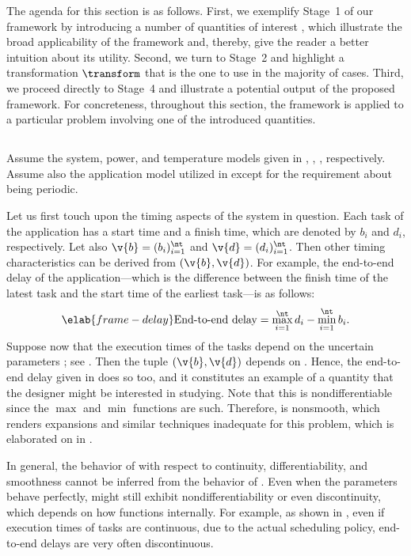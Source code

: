 The agenda for this section is as follows. First, we exemplify Stage~1 of our
framework by introducing a number of quantities of interest \g, which illustrate
the broad applicability of the framework and, thereby, give the reader a better
intuition about its utility. Second, we turn to Stage~2 and highlight a
transformation $\transform$ that is the one to use in the majority of cases.
Third, we proceed directly to Stage~4 and illustrate a potential output of the
proposed framework. For concreteness, throughout this section, the framework is
applied to a particular problem involving one of the introduced quantities.

\subsection{\problemtitle}

Assume the system, power, and temperature models given in ,
, , respectively. Assume also the
application model utilized in  except for the
requirement about being periodic.

Let us first touch upon the timing aspects of the system in question. Each task
of the application has a start time and a finish time, which are denoted by
$b_i$ and $d_i$, respectively. Let also $\v{b} = (b_i)_{i = 1}^\nt$ and $\v{d} =
(d_i)_{i = 1}^\nt$. Then other timing characteristics can be derived from
$(\v{b}, \v{d})$. For example, the end-to-end delay of the application---which
is the difference between the finish time of the latest task and the start time
of the earliest task---is as follows:
\begin{equation} \elab{frame-delay}
  \text{End-to-end delay}
  = \max_{i = 1}^\nt d_i - \min_{i = 1}^\nt b_i.
\end{equation}
Suppose now that the execution times of the tasks depend on the uncertain
parameters \vu; see . Then the tuple $(\v{b}, \v{d})$
depends on \vu. Hence, the end-to-end delay given in  does so
too, and it constitutes an example of a quantity \g that the designer might be
interested in studying. Note that this \g is nondifferentiable since the $\max$
and $\min$ functions are such. Therefore, \g is nonsmooth, which renders 
expansions and similar techniques inadequate for this problem, which is
elaborated on in .

\begin{remark} 
In general, the behavior of \g with respect to continuity, differentiability,
and smoothness cannot be inferred from the behavior of \vu. Even when the
parameters behave perfectly, \g might still exhibit nondifferentiability or even
discontinuity, which depends on how \g functions internally. For example, as
shown in \cite{tanasa2015}, even if execution times of tasks are continuous, due
to the actual scheduling policy, end-to-end delays are very often discontinuous.
\end{remark}

